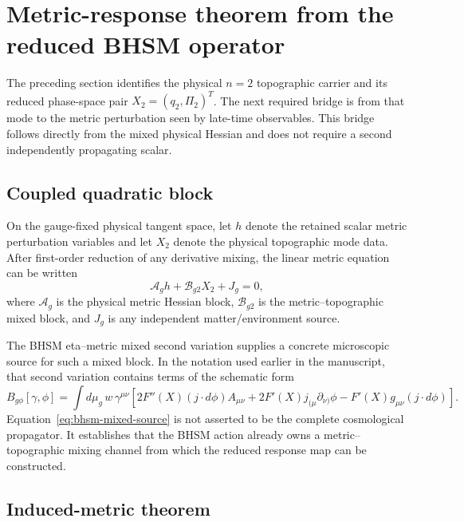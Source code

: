 \section{Metric-response theorem from the reduced BHSM operator}
\label{sec:bhsm-metric-response}

The preceding section identifies the physical $n=2$ topographic carrier and
its reduced phase-space pair $X_2=(q_2,\Pi_2)^T$.  The next required bridge is
from that mode to the metric perturbation seen by late-time observables.  This
bridge follows directly from the mixed physical Hessian and does not require
a second independently propagating scalar.

\subsection{Coupled quadratic block}

On the gauge-fixed physical tangent space, let $h$ denote the retained scalar
metric perturbation variables and let $X_2$ denote the physical topographic
mode data.  After first-order reduction of any derivative mixing, the linear
metric equation can be written
\begin{equation}
\mathcal A_g h
+
\mathcal B_{g2}X_2
+
J_g
=
0,
\label{eq:metric-block}
\end{equation}
where $\mathcal A_g$ is the physical metric Hessian block,
$\mathcal B_{g2}$ is the metric--topographic mixed block, and $J_g$ is any
independent matter/environment source.

The BHSM eta--metric mixed second variation supplies a concrete microscopic
source for such a mixed block.  In the notation used earlier in the
manuscript, that second variation contains terms of the schematic form
\begin{equation}
B_{g\phi}[\gamma,\phi]
=
\int d\mu_g\,w\,\gamma^{\mu\nu}
\left[
2F''(X)(j\!\cdot\! d\phi)A_{\mu\nu}
+
2F'(X)j_{(\mu}\partial_{\nu)}\phi
-
F'(X)g_{\mu\nu}(j\!\cdot\!d\phi)
\right].
\label{eq:bhsm-mixed-source}
\end{equation}
Equation~\eqref{eq:bhsm-mixed-source} is not asserted to be the complete
cosmological propagator.  It establishes that the BHSM action already owns a
metric--topographic mixing channel from which the reduced response map can be
constructed.

\subsection{Induced-metric theorem}

